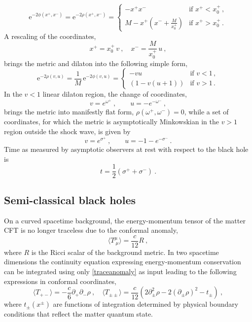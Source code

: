 \documentclass[12pt,a4paper]{article}
\newcommand{\e}{\mathrm{e}}
\newcommand{\be}{\begin{equation}}
\newcommand{\ee}{\end{equation}}
\newcommand{\f}[2]{\frac{#1}{#2}}
\begin{document}
\be
\label{kruskalmetric}
\e^{-2\phi(x^+,x^-)} = \e^{-2\rho(x^+,x^-)} =
\begin{cases} -x^+x^- & \text{if $x^{+}<x^+_0$}\,, \\ M-x^+\left( x^-+\f{M}{x^+_0}\right) & \text{if $x^{+}> x^+_0$}\,.
\end{cases}
\ee
A rescaling of the coordinates,
\be\label{rescaledcoords}
x^+ = x^+_0\, v~,\quad x^- = \f{M}{x^+_0}\,u~,
\ee
brings the metric and dilaton into the following simple form,
\be
\label{vumetric}
\e^{-2\rho(v,u)} = \f1M\,\e^{-2\phi(v,u)} =
\begin{cases} -v u & \text{if $v<1$}\,, \\ \left(1-v( u+1)\right) & \text{if $v>1$}\,.
\end{cases}
\ee
In the $v<1$ linear dilaton region, the change of coordinates,
\be
\label{omegas}
v=e^{\omega^+}\>,\qquad u=-e^{-\omega^-}\>,
\ee
brings the metric into manifestly flat form, $\rho(\omega^+,\omega^-)=0$, while a
set of coordinates, for which the metric is asymptotically Minkowskian in the $v>1$ region outside the 
shock wave, is given by 
\be
\label{sigmas}
v=e^{\sigma^+}\>,\qquad u=-1-e^{-\sigma^-}\>.
\ee
Time as measured by asymptotic observers at rest with respect to the black hole is
\be
\label{asymptotictime}
t=\f12 (\sigma^++\sigma^-)\>.
\ee

\subsection{Semi-classical black holes}\label{semiclassicalbackreac}

On a curved spacetime background, the energy-momentum tensor of the matter CFT is no longer traceless due to the conformal anomaly,
\be\label{traceanomaly}
\langle T_{\ \mu}^{\mu}\rangle = \f{c}{12} R~,
\ee
where $R$ is the Ricci scalar of the background metric. In two spacetime dimensions the continuity equation expressing energy-momentum conservation can be integrated using only \eqref{traceanomaly} as input \cite{Christensen:1977jc} leading to the following expressions in conformal coordinates,
\be\label{Tofrho}
\langle T_{+-} \rangle = -\f{c}{6} \partial_+\partial_-\rho~,\quad \langle T_{\pm\pm}\rangle=\f{c}{12}\left(2\partial_\pm^2 \rho-2(\partial_\pm\rho)^2 - t_\pm \right)~,
\ee 
where $t_\pm(x^\pm)$ are functions of integration determined by physical boundary conditions that reflect the matter quantum state.
\end{document}

